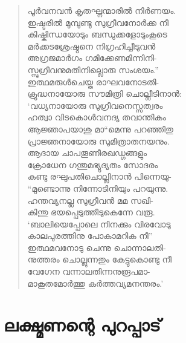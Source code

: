 \begin{verse}
പൂര്‍വനവന്‍ കൃതഘ്നന്മാരില്‍ നിര്‍ണയം.\\
ഇഷ്ടരില്‍ മുമ്പുണ്ടു സുഗ്രീവനോര്‍ക്ക നീ\\
കിഷ്കിന്ധയോടും ബന്ധുക്കളോടുംകൂടെ\\
മര്‍ക്കടശ്രേഷ്ഠനെ നിഗ്രഹിച്ചീടുവന്‍\\
അഗ്രജമാര്‍ഗം ഗമിക്കേണമിന്നിനി-\\
സ്സുഗ്രീവനുമതിനില്ലൊരു സംശയം.”\\
ഇത്ഥമരുള്‍ചെയ്ത രാഘവനോടതി-\\
ക്രുദ്ധനായോരു സൗമിത്രി ചൊല്ലീടിനാന്‍:\\
‘വധ്യനായോരു സുഗ്രീവനെസ്സത്വരം\\
ഹത്വാ വിടകൊള്‍വനദ്യ തവാന്തികം\\
ആജ്ഞാപയാശു മാ“മെന്നു പറഞ്ഞിതു\\
പ്രാജ്ഞനായോരു സുമിത്രാതനയനും.\\
ആദായ ചാപതൂണീരഖഡ്ഗങ്ങളും\\
ക്രോധേന ഗന്തുമഭ്യുദ്യതം സോദരം\\
കണ്ടു രഘുപതിചൊല്ലിനാന്‍ പിന്നെയു-\\
“മുണ്ടൊന്നു നിന്നോടിനിയും പറയുന്നു.\\
ഹന്തവ്യനല്ല സുഗ്രീവന്‍ മമ സഖി-\\
കിന്തു ഭയപ്പെടുത്തീടുകെന്നേ വരൂ.\\
‘ബാലിയെപ്പോലെ നിനക്കും വിരവോടു\\
കാലപുരത്തിനു പോകാമറിക നീ”\\
ഇത്ഥമവനോടു ചെന്നു ചൊന്നാലതി-\\
നുത്തരം ചൊല്ലുന്നതും കേട്ടുകൊണ്ടു നീ\\
വേഗേന വന്നാലതിന്നനുരൂപമാ-\\
മാകൂതമോര്‍ത്തു കര്‍ത്തവ്യമനന്തരം.’
\end{verse}


\section{ലക്ഷ്മണന്റെ പുറപ്പാട്}

